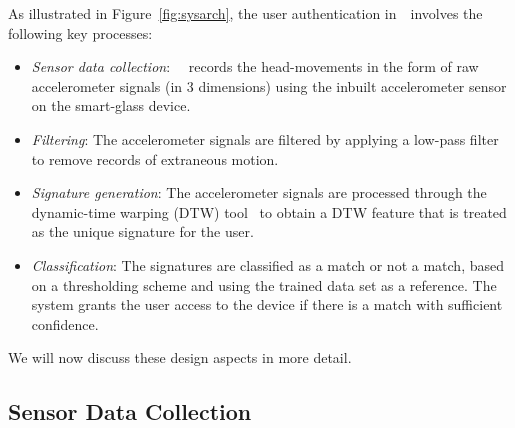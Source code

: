As illustrated in Figure~\ref{fig:sysarch}, the user 
authentication in~\systemname~involves the following key processes:
\begin{itemize}

\vspace{-2pt}\item {\em Sensor data collection}: ~\systemname~records the head-movements
in the form of raw accelerometer signals (in 3 dimensions) using the inbuilt 
accelerometer
sensor on the smart-glass device.
\vspace{-2pt}\item {\em Filtering}: The accelerometer signals are filtered by applying  
a low-pass filter to remove records of extraneous motion.
\vspace{-2pt}\item {\em Signature generation}: The accelerometer signals are
processed through the dynamic-time warping (DTW) tool~\cite{dtw} to obtain a
DTW feature that is treated as the unique signature for the user.
\vspace{-2pt}\item {\em Classification}: The signatures are classified as 
a match or not a match, based on a thresholding 
scheme and using the trained data set as a reference. The system grants the 
user access to the device if there is a match 
with sufficient confidence.
\end{itemize}

We will now discuss these design aspects in more detail.
\newpage
\subsection{Sensor Data Collection}

